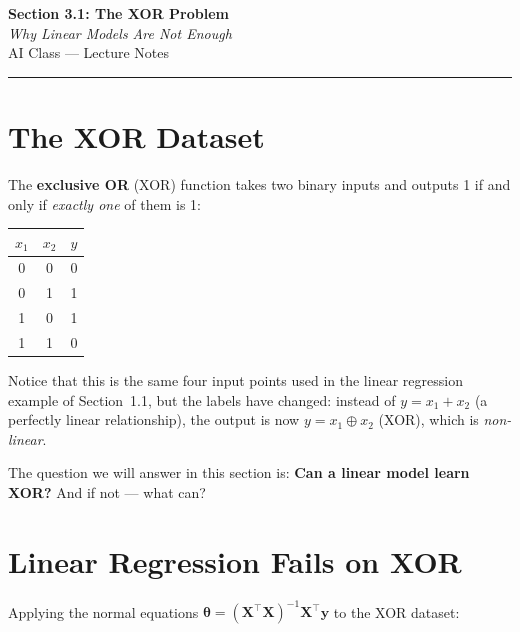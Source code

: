 \documentclass[12pt, a4paper]{article}
\newif\ifstudentmode
\theoremstyle{definition}
\newcommand{\bth}{\boldsymbol{\theta}}
\newcommand{\bX}{\mathbf{X}}
\newcommand{\by}{\mathbf{y}}
\begin{document}
\begin{center}
  {\LARGE \textbf{Section 3.1: The XOR Problem}} \\[0.3em]
  {\large\itshape Why Linear Models Are Not Enough} \\[0.5em]
  {\large AI Class — Lecture Notes}%
  \ifstudentmode
    \quad {\normalsize\color{gray}[Student Copy]}%
  \fi
\end{center}

\vspace{1em}
\hrule
\vspace{1.5em}

\section{The XOR Dataset}

The \textbf{exclusive OR} (XOR) function takes two binary inputs and outputs 1
if and only if \emph{exactly one} of them is 1:

\begin{center}
\renewcommand{\arraystretch}{1.2}
\begin{tabular}{ccc}
\toprule
$x_1$ & $x_2$ & $y$ \\
\midrule
0 & 0 & 0 \\
0 & 1 & 1 \\
1 & 0 & 1 \\
1 & 1 & 0 \\
\bottomrule
\end{tabular}
\end{center}

Notice that this is the same four input points used in the linear regression
example of Section~1.1, but the labels have changed: instead of $y = x_1 + x_2$
(a perfectly linear relationship), the output is now $y = x_1 \oplus x_2$
(XOR), which is \emph{non-linear}.

The question we will answer in this section is:
\textbf{Can a linear model learn XOR?} And if not — what can?

\section{Linear Regression Fails on XOR}

Applying the normal equations $\bth = (\bX^{\top}\bX)^{-1}\bX^{\top}\by$ to
the XOR dataset:
\end{document}
